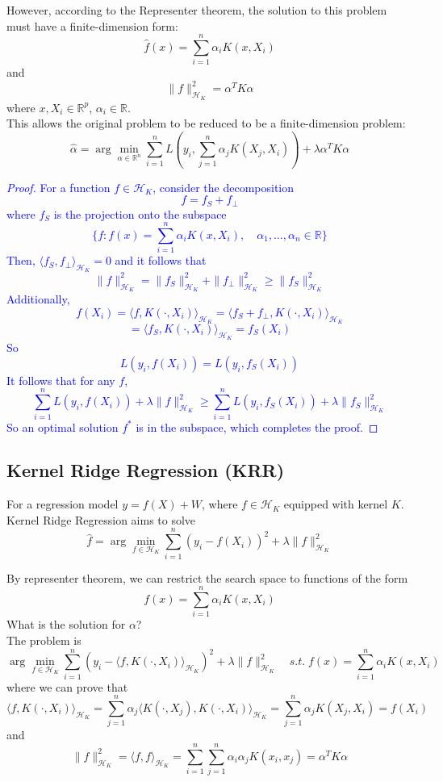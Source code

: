 \documentclass[12pt]{book}
\theoremstyle{definition}
\theoremstyle{remark}
\newcommand{\R}{\mathbb{R}}
\begin{document}
However, according to the Representer theorem, the solution to this problem must have a finite-dimension form: 
\[\hat{f}(x) = \sum_{i=1}^n\alpha_iK(x, X_i)\]
and
\[\|f\|_{\mathcal{H}_K}^2 = \alpha^TK\alpha\]
where $x, X_i \in \R^p$, $\alpha_i\in\R$.\\

This allows the original problem to be reduced to be a finite-dimension problem:
\[\hat{\alpha} = \arg\underset{\alpha\in\R^n}{\min}\sum_{i=1}^nL(y_i, \sum_{j=1}^n\alpha_jK(X_j, X_i))+\lambda\alpha^TK\alpha\]


\textcolor{blue}{
\begin{proof}
    For a function $f\in \mathcal{H}_K$, consider the decomposition 
    \[f = f_S+f_\perp\]
    where $f_S$ is the projection onto the subspace 
    \[\{f: f(x) = \sum_{i=1}^n\alpha_iK(x, X_i), \quad \alpha_1,\dots,\alpha_n\in\R\}\]
    Then, $\langle f_S, f_\perp\rangle_{\mathcal{H}_K} = 0$ and it follows that 
    \[\|f\|_{\mathcal{H}_K}^2 = \|f_S\|_{\mathcal{H}_K}^2+\|f_\perp\|_{\mathcal{H}_K}^2\ge\|f_S\|_{\mathcal{H}_K}^2\]
    Additionally, 
    \[f(X_i) = \langle f, K(\cdot, X_i)\rangle_{\mathcal{H}_K} = \langle f_S+f_\perp, K(\cdot, X_i)\rangle_{\mathcal{H}_K}\]
    \[ = \langle f_S, K(\cdot, X_i)\rangle_{\mathcal{H}_K} = f_S(X_i)\]
    So \[L(y_i,  f(X_i)) = L(y_i,  f_S(X_i))\]
    It follows that for any $f$, 
    \[\sum_{i=1}^nL(y_i,  f(X_i))+\lambda\|f\|_{\mathcal{H}_K}^2\ge \sum_{i=1}^nL(y_i,  f_S(X_i))+\lambda\|f_S\|_{\mathcal{H}_K}^2\]
    So an optimal solution $f^*$ is in the subspace, which completes the proof.
\end{proof}
}

\subsection{Kernel Ridge Regression (KRR)}
For a regression model $y = f(X)+W$, where $f\in\mathcal{H}_K$ equipped with kernel $K$. Kernel Ridge Regression aims to solve 
\[\hat{f} = \arg\underset{f\in\mathcal{H}_K}{\min}\sum_{i=1}^n(y_i-  f(X_i))^2+\lambda\|f\|_{\mathcal{H}_K}^2\]

By representer theorem, we can restrict the search space to functions of the form \[f(x) = \sum_{i=1}^n\alpha_iK(x, X_i)\]
What is the solution for $\alpha$?\\

The problem is 
\[\arg\underset{f\in\mathcal{H}_K}{\min}\sum_{i=1}^n(y_i-  \langle f, K(\cdot,X_i)\rangle_{\mathcal{H}_K})^2+\lambda\|f\|_{\mathcal{H}_K}^2\quad s.t. \;f(x) = \sum_{i=1}^n\alpha_iK(x, X_i)\]
where we can prove that \[\langle f, K(\cdot,X_i)\rangle_{\mathcal{H}_K} = \sum_{j=1}^n\alpha_j\langle K(\cdot, X_j),K(\cdot, X_i)\rangle_{\mathcal{H}_K} = \sum_{j=1}^n\alpha_jK(X_j, X_i) = f(X_i)\]
and \[\|f\|_{\mathcal{H}_K}^2 = \langle f, f\rangle_{\mathcal{H}_K} = \sum_{i=1}^n\sum_{j=1}^n\alpha_i\alpha_jK(x_i,x_j) = \alpha^TK\alpha\]
\end{document}
